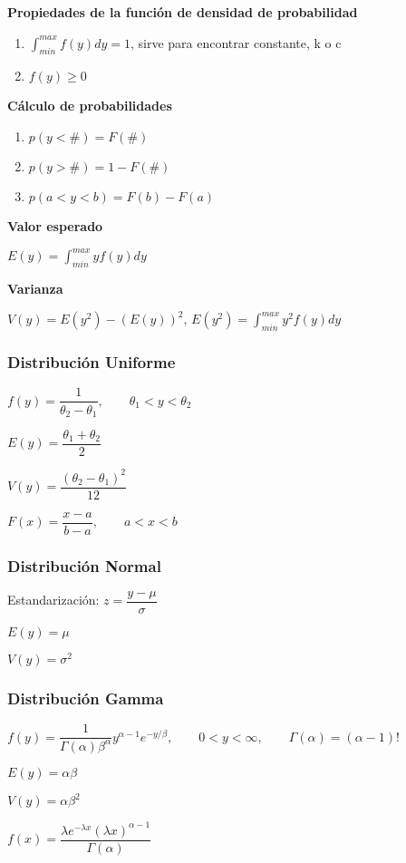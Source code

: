 \textbf{Propiedades de la función de densidad de probabilidad}
\begin{enumerate}
	\item $\int_{min}^{max}f(y)dy=1$, sirve para encontrar constante, k o c
	\item $f (y) \geq0$
\end{enumerate}

\textbf{Cálculo de probabilidades}
\begin{enumerate}
	\item $p(y<\#)=F(\#)$
	\item $p(y>\#)=1-F(\#)$
	\item $p(a<y<b)=F(b)-F(a)$
\end{enumerate}

\textbf{Valor esperado}

$E(y)=\int_{min}^{max}yf(y)dy$

\textbf{Varianza}

$V(y)=E(y^2)-(E(y))^2$, $E(y^2)=\int_{min}^{max}y^2f(y)dy$

\subsubsection{Distribución Uniforme}
$f(y)=\dfrac{1}{\theta_2-\theta_1},\qquad \theta_1<y<\theta_2$

$E(y)=\dfrac{\theta_1+\theta_2}{2}$

$V(y)=\dfrac{(\theta_2-\theta_1)^2}{12}$

$F(x)=\dfrac{x-a}{b-a},\qquad a<x<b$

\subsubsection{Distribución Normal} 
Estandarización: $z=\dfrac{y-\mu}{\sigma}$

$E(y)=\mu$

$V(y)=\sigma^2$

\subsubsection{Distribución Gamma}
$f(y)=\dfrac{1}{\Gamma(\alpha)\beta^\alpha}y^{\alpha-1}e^{-y/\beta}, \qquad 0<y<\infty, \qquad\Gamma(\alpha)=(\alpha-1)!$

$E(y)=\alpha\beta$

$V(y)=\alpha\beta^2$

$f(x)=\dfrac{\lambda e^{-\lambda x}(\lambda x)^{\alpha-1}}{\Gamma(\alpha)}$

